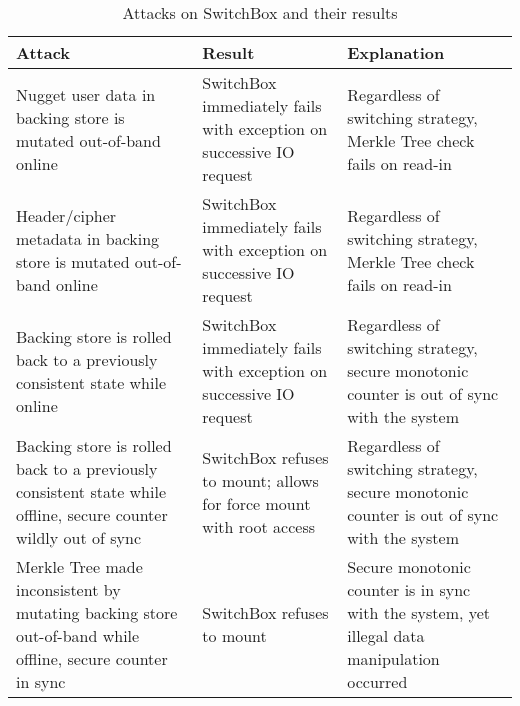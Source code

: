 \begin{table}[t]
  \caption{Attacks on SwitchBox and their results}\label{tbl:security}
  \footnotesize
  \centering
  \begin{tabu} to \linewidth { | X[l] | X[c] | X[c] | }
    \hline
    \textbf{Attack} & \textbf{Result} & \textbf{Explanation} \\
    \hline\hline
    Nugget user data in backing store is mutated out-of-band online & SwitchBox
    immediately fails with exception on successive IO request & Regardless of
    switching strategy, Merkle Tree check fails on read-in\\
    \hline
    Header/cipher metadata in backing store is mutated out-of-band online &
    SwitchBox immediately fails with exception on successive IO request &
    Regardless of switching strategy, Merkle Tree check fails on read-in\\
    \hline
    Backing store is rolled back to a previously consistent state while online &
    SwitchBox immediately fails with exception on successive IO request &
    Regardless of switching strategy, secure monotonic counter is out of sync
    with the system\\
    \hline
    Backing store is rolled back to a previously consistent state while offline,
    secure counter wildly out of sync & SwitchBox refuses to mount; allows for
    force mount with root access & Regardless of switching strategy, secure
    monotonic counter is out of sync with the system\\
    \hline
    Merkle Tree made inconsistent by mutating backing store out-of-band while
    offline, secure counter in sync & SwitchBox refuses to mount & Secure
    monotonic counter is in sync with the system, yet illegal data manipulation
    occurred\\
    \hline\hline
  \end{tabu}
\end{table}
